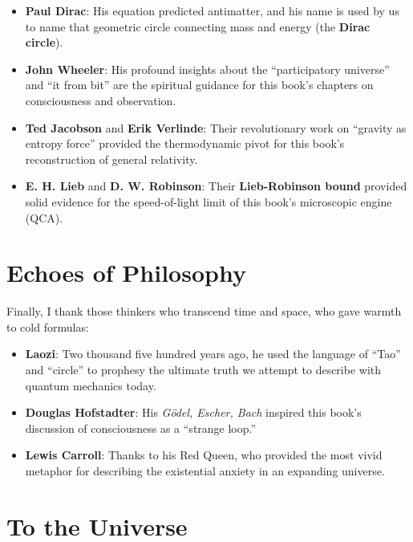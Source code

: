 \begin{itemize}
\item \textbf{Paul Dirac}: His equation predicted antimatter, and his name is used by us to name that geometric circle connecting mass and energy (the \textbf{Dirac circle}).

\item \textbf{John Wheeler}: His profound insights about the ``participatory universe'' and ``it from bit'' are the spiritual guidance for this book's chapters on consciousness and observation.

\item \textbf{Ted Jacobson} and \textbf{Erik Verlinde}: Their revolutionary work on ``gravity as entropy force'' provided the thermodynamic pivot for this book's reconstruction of general relativity.

\item \textbf{E. H. Lieb} and \textbf{D. W. Robinson}: Their \textbf{Lieb-Robinson bound} provided solid evidence for the speed-of-light limit of this book's microscopic engine (QCA).
\end{itemize}

\section{Echoes of Philosophy}

Finally, I thank those thinkers who transcend time and space, who gave warmth to cold formulas:

\begin{itemize}
\item \textbf{Laozi}: Two thousand five hundred years ago, he used the language of ``Tao'' and ``circle'' to prophesy the ultimate truth we attempt to describe with quantum mechanics today.

\item \textbf{Douglas Hofstadter}: His \textit{Gödel, Escher, Bach} inspired this book's discussion of consciousness as a ``strange loop.''

\item \textbf{Lewis Carroll}: Thanks to his Red Queen, who provided the most vivid metaphor for describing the existential anxiety in an expanding universe.
\end{itemize}

\section{To the Universe}

